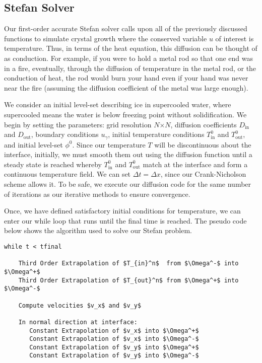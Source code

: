 \documentclass[oneside,12pt,final]{/Applications/TeX/packages/ucthesis-CA2012}
\begin{document}
\begin{mainmatter}
\chapter{Stefan Solver}\label{section:snowflake}

Our first-order accurate Stefan solver calls upon all of the previously discussed functions to simulate crystal growth where the conserved variable $u$ of interest is temperature. Thus, in terms of the heat equation, this diffusion can be thought of as conduction. For example, if you were to hold a metal rod so that one end was in a fire, eventually, through the diffusion of temperature in the metal rod, or the conduction of heat, the rod would burn your hand even if your hand was never near the fire (assuming the diffusion coefficient of the metal was large enough).

We consider an initial level-set describing ice in supercooled water, where supercooled means the water is below freezing point without solidification. We begin by setting the parameters: grid resolution $N$$\times$$N$, diffusion coefficients $D_\text{in}$ and $D_\text{out}$, boundary conditions $u_\gamma$, initial temperature conditions $T^0_\text{in}$ and $T^0_\text{out}$, and initial level-set $\phi^0$. Since our temperature $T$ will be discontinuous about the interface, initially, we must smooth them out using the diffusion function until a steady state is reached whereby $T_\text{in}^0$ and  $T_\text{out}^0$ match at the interface and form a continuous temperature field. We can set $\Delta t = \Delta x$, since our Crank-Nicholson scheme allows it. To be safe, we execute our diffusion code for the same number of iterations as our iterative methods to ensure convergence.

Once, we have defined satisfactory initial conditions for temperature, we can enter our while loop that runs until the final time is reached. The pseudo code below shows the algorithm used to solve our Stefan problem.\\

\ssp
\begin{lstlisting}
while t < tfinal
    
    Third Order Extrapolation of $T_{in}^n$  from $\Omega^-$ into $\Omega^+$
    Third Order Extrapolation of $T_{out}^n$ from $\Omega^+$ into $\Omega^-$ 
    
    Compute velocities $v_x$ and $v_y$
    
    In normal direction at interface:
       Constant Extrapolation of $v_x$ into $\Omega^+$
       Constant Extrapolation of $v_x$ into $\Omega^-$
       Constant Extrapolation of $v_y$ into $\Omega^+$
       Constant Extrapolation of $v_y$ into $\Omega^-$
    

\end{lstlisting}
\end{mainmatter}
\end{document}
